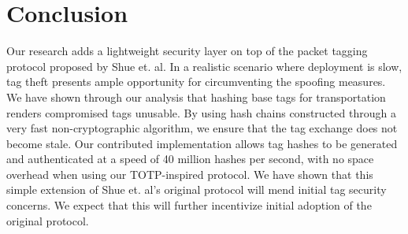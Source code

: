 \documentclass[12pt]{article} %
\begin{document}
\section{Conclusion}

Our research adds a lightweight security layer on top of the packet tagging protocol proposed by Shue et. al. In a realistic scenario where deployment is slow, tag theft presents ample opportunity for circumventing the spoofing measures. We have shown through our analysis that hashing base tags for transportation renders compromised tags unusable. By using hash chains constructed through a very fast non-cryptographic algorithm, we ensure that the tag exchange does not become stale. Our contributed implementation allows tag hashes to be generated and authenticated at a speed of 40 million hashes per second, with no space overhead when using our TOTP-inspired protocol. We have shown that this simple extension of Shue et. al's original protocol will mend initial tag security concerns. We expect that this will further incentivize initial adoption of the original protocol.








\end{document}
